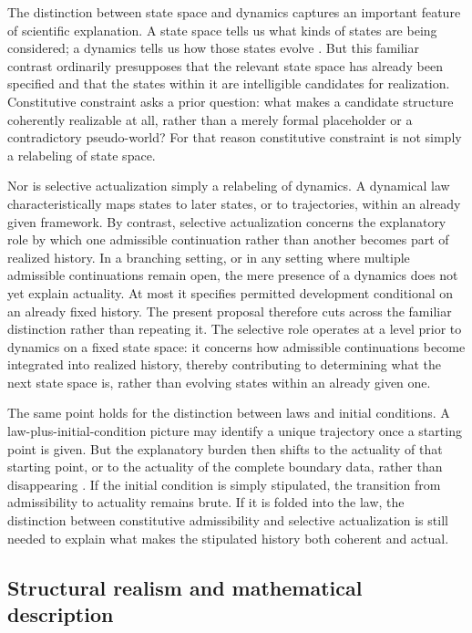 \documentclass[11pt]{article}
\theoremstyle{foundation}
\begin{document}
The distinction between state space and dynamics captures an important feature of scientific explanation. A state space tells us what kinds of states are being considered; a dynamics tells us how those states evolve \citep{Cartwright1983,Maudlin2007}. But this familiar contrast ordinarily presupposes that the relevant state space has already been specified and that the states within it are intelligible candidates for realization. Constitutive constraint asks a prior question: what makes a candidate structure coherently realizable at all, rather than a merely formal placeholder or a contradictory pseudo-world? For that reason constitutive constraint is not simply a relabeling of state space.

Nor is selective actualization simply a relabeling of dynamics. A dynamical law characteristically maps states to later states, or to trajectories, within an already given framework. By contrast, selective actualization concerns the explanatory role by which one admissible continuation rather than another becomes part of realized history. In a branching setting, or in any setting where multiple admissible continuations remain open, the mere presence of a dynamics does not yet explain actuality. At most it specifies permitted development conditional on an already fixed history. The present proposal therefore cuts across the familiar distinction rather than repeating it. The selective role operates at a level prior to dynamics on a fixed state space: it concerns how admissible continuations become integrated into realized history, thereby contributing to determining what the next state space is, rather than evolving states within an already given one.

The same point holds for the distinction between laws and initial conditions. A law-plus-initial-condition picture may identify a unique trajectory once a starting point is given. But the explanatory burden then shifts to the actuality of that starting point, or to the actuality of the complete boundary data, rather than disappearing \citep{Armstrong1983,Dretske1977,Tooley1977,Bird2007}. If the initial condition is simply stipulated, the transition from admissibility to actuality remains brute. If it is folded into the law, the distinction between constitutive admissibility and selective actualization is still needed to explain what makes the stipulated history both coherent and actual.

\subsection{Structural realism and mathematical description}
\end{document}
